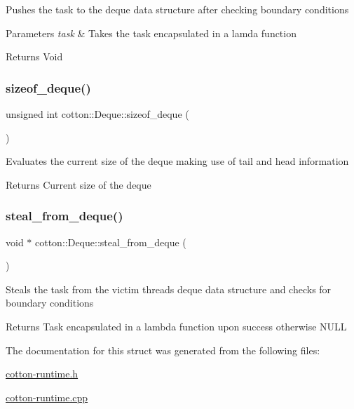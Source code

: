 Pushes the task to the deque data structure after checking boundary conditions


\begin{DoxyParams}{Parameters}
{\em task} & Takes the task encapsulated in a lamda function \\
\hline
\end{DoxyParams}
\begin{DoxyReturn}{Returns}
Void 
\end{DoxyReturn}
\mbox{\label{structcotton_1_1Deque_af98d02aa97ac2dcaac8c7894cb9cb855}} 
\subsubsection{\texorpdfstring{sizeof\+\_\+deque()}{sizeof\_deque()}}
{\footnotesize\ttfamily unsigned int cotton\+::\+Deque\+::sizeof\+\_\+deque (\begin{DoxyParamCaption}{ }\end{DoxyParamCaption})}

Evaluates the current size of the deque making use of tail and head information

\begin{DoxyReturn}{Returns}
Current size of the deque 
\end{DoxyReturn}
\mbox{\label{structcotton_1_1Deque_a33215b0b811484e2af94f2db16a5c15c}} 
\subsubsection{\texorpdfstring{steal\+\_\+from\+\_\+deque()}{steal\_from\_deque()}}
{\footnotesize\ttfamily void $\ast$ cotton\+::\+Deque\+::steal\+\_\+from\+\_\+deque (\begin{DoxyParamCaption}{ }\end{DoxyParamCaption})}

Steals the task from the victim thread\textquotesingle{}s deque data structure and checks for boundary conditions

\begin{DoxyReturn}{Returns}
Task encapsulated in a lambda function upon success otherwise N\+U\+LL 
\end{DoxyReturn}


The documentation for this struct was generated from the following files\+:\begin{DoxyCompactItemize}
\item 
\mbox{\hyperlink{cotton-runtime_8h}{cotton-\/runtime.\+h}}\item 
\mbox{\hyperlink{cotton-runtime_8cpp}{cotton-\/runtime.\+cpp}}\end{DoxyCompactItemize}
